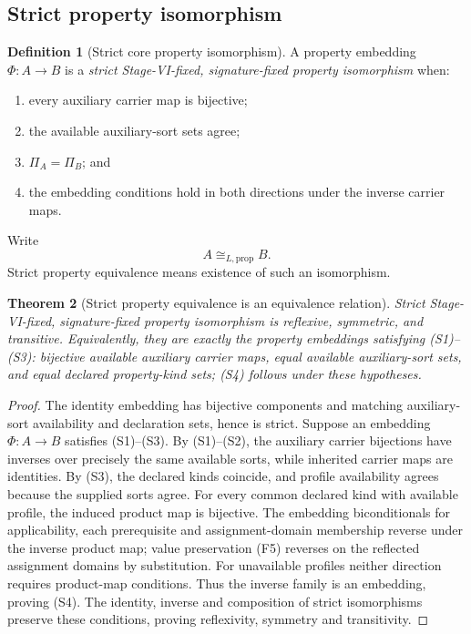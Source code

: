 \documentclass[11pt]{article}
\newtheorem{theorem}{Theorem}[section]
\theoremstyle{definition}
\newtheorem{definition}[theorem]{Definition}
\theoremstyle{remark}
\begin{document}
\subsection{Strict property isomorphism}

\begin{definition}[Strict core property isomorphism]
\label{def:strict-iso}
A property embedding \(\Phi:A\to B\) is a \emph{strict Stage-VI-fixed, signature-fixed property isomorphism} when:
\begin{enumerate}[label=(S\arabic*)]
\item every auxiliary carrier map is bijective;
\item the available auxiliary-sort sets agree;
\item \(\Pi_A=\Pi_B\); and
\item the embedding conditions hold in both directions under the inverse carrier maps.
\end{enumerate}
Write
\[
A\cong_{L,\mathrm{prop}} B.
\]
Strict property equivalence means existence of such an isomorphism.
\end{definition}

\begin{theorem}[Strict property equivalence is an equivalence relation]
\label{thm:strict-equivalence}
Strict Stage-VI-fixed, signature-fixed property isomorphism is reflexive, symmetric, and transitive.
Equivalently, they are exactly the property embeddings satisfying (S1)--(S3): bijective available auxiliary carrier maps, equal available auxiliary-sort sets, and equal declared property-kind sets; (S4) follows under these hypotheses.
\end{theorem}

\begin{proof}
The identity embedding has bijective components and matching auxiliary-sort availability and declaration sets, hence is strict.
Suppose an embedding \(\Phi:A\to B\) satisfies (S1)--(S3).
By (S1)--(S2), the auxiliary carrier bijections have inverses over precisely the same available sorts, while inherited carrier maps are identities.
By (S3), the declared kinds coincide, and profile availability agrees because the supplied sorts agree.
For every common declared kind with available profile, the induced product map is bijective.
The embedding biconditionals for applicability, each prerequisite and assignment-domain membership reverse under the inverse product map; value preservation (F5) reverses on the reflected assignment domains by substitution.
For unavailable profiles neither direction requires product-map conditions.
Thus the inverse family is an embedding, proving (S4).
The identity, inverse and composition of strict isomorphisms preserve these conditions, proving reflexivity, symmetry and transitivity.
\end{proof}
\end{document}
